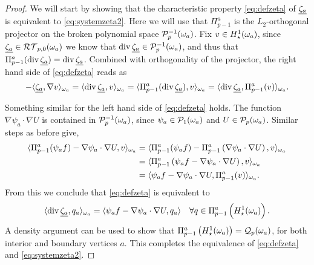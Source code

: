 \documentclass[thesis.tex]{subfiles}
\begin{document}
\begin{proof}
  We will start by showing that the characteristic property \eqref{eq:defzeta}  of $\underline{\zeta_a}$ is equivalent to \eqref{eq:systemzeta2}.
  Here we will use that $\Pi_{p-1}^a$ is the $L_2$-orthogonal projector on the broken polynomial space $\mathcal{P}_p^{-1}(\omega_a)$.  Fix $v \in H_\star^1(\omega_a)$, 
  since $\underline{\zeta_a} \in \mathcal{RT}_{p,0}(\omega_a)$ we know that ${\operatorname{div} \underline{\zeta_a} \in \mathcal{P}_p^{-1}(\omega_a)}$, and thus that $\Pi_{p-1}^a( \operatorname{div} \underline{\zeta_a} )= \operatorname{div} \underline{\zeta_a}$. Combined with orthogonality of the projector, the right hand side of \eqref{eq:defzeta} reads as
  \[
    -\langle \underline{\zeta_a}, \nabla v \rangle_{\omega_a} = \langle \operatorname{div} \underline{\zeta_a}, v \rangle_{\omega_a} = \langle  \Pi_{p-1}^a(\operatorname{div} \underline{\zeta_a}), v \rangle_{\omega_a} = \langle \operatorname{div} \underline{\zeta_a}, \Pi_{p-1}^a(v) \rangle_{\omega_a}.
  \]

  Something similar for the left hand side of \eqref{eq:defzeta} holds. The function $\nabla \psi_a \cdot \nabla U$ is contained in
  $\mathcal{P}_p^{-1}(\omega_a)$, since $\psi_a \in \mathcal{P}_1(\omega_a)$ and $U \in \mathcal{P}_{p}(\omega_a)$. Similar steps as before give, 
  \begin{align*}
    \langle \Pi_{p-1}^a(\psi_a f) - \nabla \psi_a \cdot \nabla U, v \rangle_{\omega_a} &= \langle \Pi_{p-1}^a(\psi_a f) - \Pi_{p-1}^a\left(\nabla \psi_a \cdot \nabla U\right),v \rangle_{\omega_a}\\
    &= \langle \Pi_{p-1}^a\left(\psi_a f - \nabla \psi_a \cdot \nabla U\right), v \rangle_{\omega_a}\\
    &= \langle \psi_a f - \nabla \psi_a \cdot \nabla U, \Pi_{p-1}^a(v) \rangle_{\omega_a}.
  \end{align*}
  From this we conclude that \eqref{eq:defzeta} is equivalent to
  \begin{equation}
    \label{eq:defzetanoproj}
    \langle \operatorname{div} \underline{\zeta_a}, q_a \rangle_{\omega_a} = \langle \psi_a f - \nabla \psi_a \cdot \nabla U, q_a \rangle \quad \forall q \in \Pi_{p-1}^a\left(H_\star^1(\omega_a)\right).
  \end{equation}
  A density argument can be used to show that $\Pi_{p-1}^a\left(H_\star^1(\omega_a)\right) = \mathcal{Q}_p(\omega_a)$, for both interior and boundary vertices $a$. 
  This completes the equivalence of \eqref{eq:defzeta} and \eqref{eq:systemzeta2}.



\end{proof}
\end{document}
